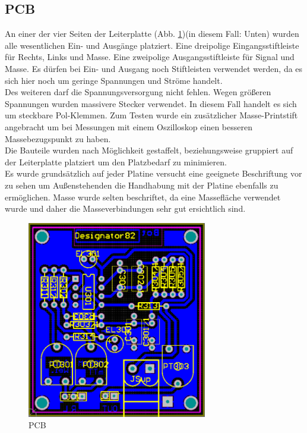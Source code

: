 \subsection{PCB}\label{subsec:4.2.3}
An einer der vier Seiten der Leiterplatte (Abb. \ref{fig:4.2.3.1})(in diesem Fall: Unten) wurden alle wesentlichen Ein- und Ausgänge platziert.
Eine dreipolige Eingangsstiftleiste für Rechts, Links und Masse.
Eine zweipolige Ausgangsstiftleiste für Signal und Masse.
Es dürfen bei Ein- und Ausgang noch Stiftleisten verwendet werden, da es sich hier noch um geringe Spannungen und Ströme handelt.\\
Des weiteren darf die Spannungsversorgung nicht fehlen.
Wegen größeren Spannungen wurden massivere Stecker verwendet.
In diesem Fall handelt es sich um steckbare Pol-Klemmen.
Zum Testen wurde ein zusätzlicher Masse-Printstift angebracht um bei Messungen mit einem Oszilloskop einen besseren Massebezugspunkt zu haben.\\
Die Bauteile wurden nach Möglichkeit gestaffelt, beziehungsweise gruppiert auf der Leiterplatte platziert um den Platzbedarf zu minimieren.\\
Es wurde grundsätzlich auf jeder Platine versucht eine geeignete Beschriftung vor zu sehen um Außenstehenden die Handhabung mit der Platine ebenfalls zu ermöglichen. Masse wurde selten beschriftet, da eine Massefläche verwendet wurde und daher die Masseverbindungen sehr gut ersichtlich sind.
\begin{figure} [H]
	\centering
	\includegraphics[width=0.7\textwidth]{img/Print3/3mTTWeicheruAddierer-PCB.PNG}
	\caption{PCB}
	\label {fig:4.2.3.1}
\end{figure}









